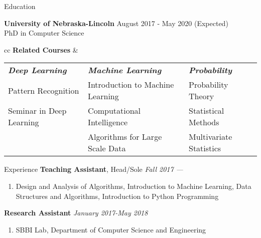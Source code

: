 \documentclass{resume} %
\newenvironment{cvEnum}
{ \begin{enumerate}[]
    \setlength{\itemsep}{0pt}
    \setlength{\parskip}{0pt}
    \setlength{\parsep}{0pt}     }
{ \end{enumerate}                  }
\begin{document}

\begin{rSection}{Education}

  {\bf University of Nebraska-Lincoln} \hfill { August 2017 - May
    2020} (Expected) 
\\ PhD in Computer Science

                        \small{
\begin{tabular}{cc}
{\bf Related Courses} &
                        
\begin{tabular}{lll}
  \textbf{{\em Deep Learning}} & \textbf{{\em Machine Learning}} & \textbf{{\em Probability}} \\
Pattern Recognition & Introduction to Machine Learning & Probability Theory\\
Seminar in Deep Learning & Computational Intelligence & Statistical Methods\\
     & Algorithms for Large Scale Data  & Multivariate Statistics\\
\end{tabular}
\end{tabular}
                        }
\end{rSection}

\begin{rSection}{Experience}
{\bf Teaching Assistant}, Head/Sole \hfill {\em Fall 2017 ---}
\begin{cvEnum}
\item Design and Analysis of Algorithms, Introduction to Machine
  Learning, Data Structures and Algorithms, Introduction to Python Programming  
\end{cvEnum}
{\bf Research Assistant} \hfill {\em January 2017-May 2018}
\begin{cvEnum}
\item SBBI Lab, Department of Computer Science and Engineering
    \end{cvEnum}

\end{rSection}
\end{document}
